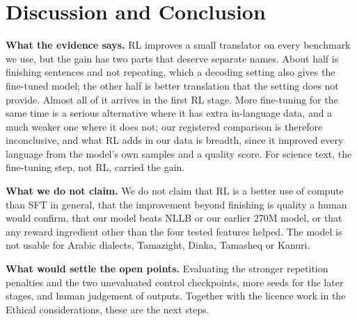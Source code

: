 \section{Discussion and Conclusion}\label{sec:discussion}
\textbf{What the evidence says.} RL improves a small translator on every benchmark we use, but the gain has two parts that deserve separate names. About half is finishing sentences and not repeating, which a decoding setting also gives the fine-tuned model; the other half is better translation that the setting does not provide. Almost all of it arrives in the first RL stage. More fine-tuning for the same time is a serious alternative where it has extra in-language data, and a much weaker one where it does not; our registered comparison is therefore inconclusive, and what RL adds in our data is breadth, since it improved every language from the model's own samples and a quality score. For science text, the fine-tuning step, not RL, carried the gain.

\textbf{What we do not claim.} We do not claim that RL is a better use of compute than SFT in general, that the improvement beyond finishing is quality a human would confirm, that our model beats NLLB or our earlier 270M model, or that any reward ingredient other than the four tested features helped. The model is not usable for Arabic dialects, Tamazight, Dinka, Tamasheq or Kanuri.

\textbf{What would settle the open points.} Evaluating the stronger repetition penalties and the two unevaluated control checkpoints, more seeds for the later stages, and human judgement of outputs. Together with the licence work in the Ethical considerations, these are the next steps.
